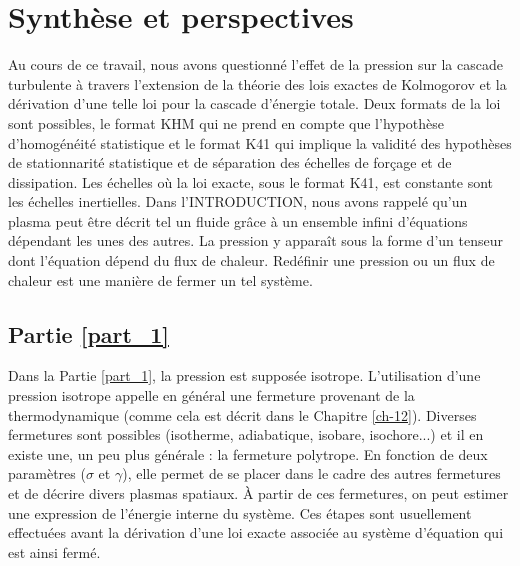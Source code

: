 \chapter{Synthèse et perspectives}
\renewcommand\partie{\Partie}

\label{ch-41}

Au cours de ce travail, nous avons questionné l'effet de la pression sur la cascade turbulente à travers l'extension de la théorie des lois exactes de Kolmogorov et la dérivation d'une telle loi pour la cascade d'énergie totale. Deux formats de la loi sont possibles, le format \acs{KHM} qui ne prend en compte que l'hypothèse d'homogénéité statistique et le format \acs{K41} qui implique la validité des hypothèses de stationnarité statistique et de séparation des échelles de forçage et de dissipation. Les échelles où la loi exacte, sous le format  \acs{K41}, est constante sont les échelles inertielles. Dans l'INTRODUCTION, nous avons rappelé qu'un plasma peut être décrit tel un fluide grâce à un ensemble infini d'équations dépendant les unes des autres. La pression y apparaît sous la forme d'un tenseur dont l'équation dépend du flux de chaleur. Redéfinir une pression ou un flux de chaleur est une manière de fermer un tel système. 

\section{Partie \ref{part_1}}

Dans la Partie \ref{part_1}, la pression est supposée isotrope. L'utilisation d'une pression isotrope appelle en général une fermeture provenant de la thermodynamique (comme cela est décrit dans le Chapitre \ref{ch-12}). Diverses fermetures sont possibles (isotherme, adiabatique, isobare, isochore...) et il en existe une, un peu plus générale : la fermeture polytrope. En fonction de deux paramètres ($\sigma$ et $\gamma$), elle permet de se placer dans le cadre des autres fermetures et de décrire divers plasmas spatiaux. À partir de ces fermetures, on peut estimer une expression de l'énergie interne du système. Ces étapes sont usuellement effectuées avant la dérivation d'une loi exacte associée au système d'équation qui est ainsi fermé. 

